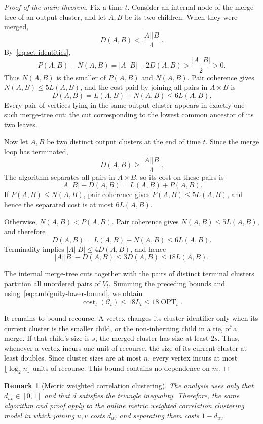 \documentclass[11pt]{article}
\newtheorem{remark}[theorem]{Remark}
\newcommand{\cost}{\operatorname{cost}}
\newcommand{\OPT}{\operatorname{OPT}}
\begin{document}
\begin{proof}[Proof of the main theorem]
Fix a time $t$.  Consider an internal node of the merge tree of an output
cluster, and let $A,B$ be its two children.  When they were merged,
\[
  D(A,B)<\frac{|A||B|}{4}.
\]
By~\eqref{eq:set-identities},
\[
 P(A,B)-N(A,B)
 =|A||B|-2D(A,B)
 >\frac{|A||B|}{2}>0.
\]
Thus $N(A,B)$ is the smaller of $P(A,B)$ and $N(A,B)$.  Pair coherence gives
$N(A,B)\le5L(A,B)$, and the cost paid by joining all pairs in $A\times B$ is
\[
 D(A,B)=L(A,B)+N(A,B)\le6L(A,B).
\]
Every pair of vertices lying in the same output cluster appears in exactly
one such merge-tree cut: the cut corresponding to the lowest common ancestor
of its two leaves.

Now let $A,B$ be two distinct output clusters at the end of time $t$.  Since
the merge loop has terminated,
\[
  D(A,B)\ge\frac{|A||B|}{4}.
\]
The algorithm separates all pairs in $A\times B$, so its cost on these pairs
is
\[
 |A||B|-D(A,B)=L(A,B)+P(A,B).
\]
If $P(A,B)\le N(A,B)$, pair coherence gives $P(A,B)\le5L(A,B)$, and hence
the separated cost is at most $6L(A,B)$.

Otherwise, $N(A,B)<P(A,B)$.  Pair coherence gives
$N(A,B)\le5L(A,B)$, and therefore
\[
  D(A,B)=L(A,B)+N(A,B)\le6L(A,B).
\]
Terminality implies $|A||B|\le4D(A,B)$, and hence
\[
 |A||B|-D(A,B)
 \le3D(A,B)
 \le18L(A,B).
\]

The internal merge-tree cuts together with the pairs of distinct terminal
clusters partition all unordered pairs of $V_t$.  Summing the preceding
bounds and using~\eqref{eq:ambiguity-lower-bound}, we obtain
\[
 \cost_t(\mathcal C_t)
 \le18L_t
 \le18\OPT_t.
\]

It remains to bound recourse.  A vertex changes its cluster identifier only
when its current cluster is the smaller child, or the non-inheriting child in
a tie, of a merge.  If that child's size is $s$, the merged cluster has size
at least $2s$.  Thus, whenever a vertex incurs one unit of recourse, the size
of its current cluster at least doubles.  Since cluster sizes are at most
$n$, every vertex incurs at most $\lfloor\log_2 n\rfloor$ units of recourse.
This bound contains no dependence on $m$.
\end{proof}

\begin{remark}[Metric weighted correlation clustering]
The analysis uses only that $d_{uv}\in[0,1]$ and that $d$ satisfies the
triangle inequality.  Therefore, the same algorithm and proof apply to the
online metric weighted correlation clustering model in which joining
$u,v$ costs $d_{uv}$ and separating them costs $1-d_{uv}$.
\end{remark}
\end{document}
